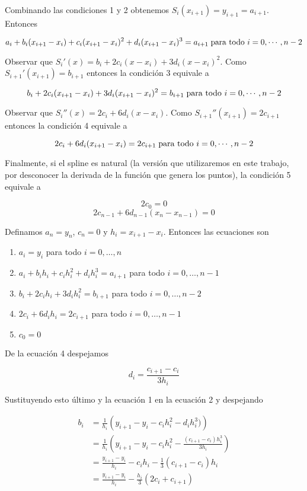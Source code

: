 Combinando las condiciones 1 y 2 obtenemos $S_i(x_{i + 1}) = y_{i + 1} = a_{i + 1}$. Entonces

\[a_i + b_i (x_{i + 1} - x_i) + c_i (x_{i + 1} - x_i)^2 + d_i (x_{i + 1} - x_i)^3 = a_{i + 1} \hspace{0.1cm}\text{para todo } i = 0, \cdots, n - 2\]

Observar que $S_i'(x) = b_i + 2c_i(x - x_i) + 3 d_i (x - x_i)^2$. Como $S_{i + 1}'(x_{i + 1}) = b_{i + 1}$ entonces la condición 3 equivale a 

\[b_i + 2c_i(x_{i + 1} - x_i) + 3 d_i (x_{i + 1} - x_i)^2 = b_{i + 1} \hspace{0.1cm}\text{para todo } i = 0, \cdots, n - 2\]

Observar que $S_i''(x) = 2c_i + 6d_i(x - x_i)$. Como $S_{i + 1}''(x_{i + 1}) = 2c_{i + 1}$ entonces la condición 4 equivale a

\[2c_i + 6d_i(x_{i + 1} - x_i) = 2c_{i + 1} \hspace{0.1cm}\text{para todo } i = 0, \cdots, n - 2\]

Finalmente, si el spline es natural (la versión que utilizaremos en este trabajo, por desconocer la derivada de la función que genera los puntos), la condición 5 equivale a

\[2c_0 = 0\]
\[2c_{n - 1} + 6d_{n - 1}(x_n - x_{n - 1}) = 0\]

Definamos $a_n = y_n$, $c_n = 0$ y $h_i = x_{i + 1} - x_i$. Entonces las ecuaciones son

\begin{enumerate}
\item $a_i = y_i$ para todo $i = 0, \ldots, n$
\item $a_i + b_ih_{i} + c_i h_{i}^2 + d_i h_{i}^3 = a_{i + 1}$ para todo $i = 0, \ldots, n - 1$
\item $b_i + 2c_i h_{i} + 3d_i h_{i} ^2 = b_{i + 1}$ para todo $i = 0, \ldots, n - 2$
\item $2c_i + 6d_i h_{i} = 2c_{i + 1}$ para todo $i = 0, \ldots, n - 1$
\item $c_0 = 0$
\end{enumerate} 

De la ecuación 4 despejamos

\[d_i = \frac{c_{i + 1} - c_i}{3 h_{i}}\]

Sustituyendo esto último y la ecuación 1 en la ecuación 2 y despejando

\begin{align*}
b_i &= \frac{1}{h_{i}}\left(y_{i + 1} - y_i - c_i h_{i}^2 - d_i h_{i}^3)\right)\\
    &= \frac{1}{h_{i}}\left(y_{i + 1} - y_i - c_i h_{i}^2 - \frac{(c_{i + 1} - c_i) h_{i}^3}{3 h_{i}}\right)\\
    &= \frac{y_{i + 1} - y_i}{h_{i}} - c_i h_{i} - \frac{1}{3} (c_{i + 1} - c_i) h_{i}\\
    &= \frac{y_{i + 1} - y_i}{h_{i}} - \frac{h_{i}}{3}\left(2c_i + c_{i + 1}\right)
\end{align*}

